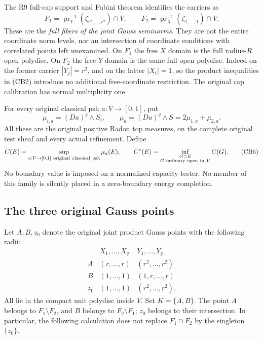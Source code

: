 The R9 full-cap support and Fubini theorem identifies the carriers as
\[
 F_1=\operatorname{pr}_Y^{-1}(\zeta_{r^2,\ldots,r^2})\cap V,
 \qquad
 F_2=\operatorname{pr}_X^{-1}(\zeta_{1,\ldots,1})\cap V.
 \tag{CB4}
\]
These are the \emph{full fibers of the joint Gauss seminorms}.
They are not the entire coordinate norm levels, nor an intersection
of coordinate conditions with correlated points left unexamined.
On $F_1$ the free $X$ domain is the full radius-$R$ open
polydisc. On $F_2$ the free $Y$ domain is the same full open
polydisc. Indeed on the former carrier $|Y_j|=r^2$, and on the
latter $|X_i|=1$, so the product inequalities in (CB2) introduce
no additional free-coordinate restriction. The original cap
calibration has normal multiplicity one.

For every original classical psh $a:V\to[0,1]$, put
\[
 \mu_{i,a}=(Da)^q\wedge S_i,\qquad
 \mu_a=(Da)^q\wedge S=2\mu_{1,a}+\mu_{2,a}.
 \tag{CB5}
\]
All these are the original positive Radon top measures, on the
complete original test sheaf and every actual refinement. Define
\[
 C(E)=\sup_{a:V\to[0,1]\ {\rm original\ classical\ psh}}\mu_a(E),
 \qquad
 C^*(E)=\inf_{\substack{G\supset E\\G\ {\rm ordinary\ open\ in}\ V}}C(G).
 \tag{CB6}
\]
No boundary value is imposed on a normalized capacity tester.
No member of this family is silently placed in a zero-boundary
energy completion.

\subsection{The three original Gauss points}

Let $A,B,z_0$ denote the original joint product Gauss points with
the following radii:
\[
 \begin{array}{c|c|c}
       &X_1,\ldots,X_q&Y_1,\ldots,Y_q\\ \hline
 A     &(r,\ldots,r)&(r^2,\ldots,r^2)\\
 B     &(1,\ldots,1)&(1,r,\ldots,r)\\
 z_0   &(1,\ldots,1)&(r^2,\ldots,r^2).
 \end{array}
 \tag{CB7}
\]
All lie in the compact unit polydisc inside $V$. Set
$K=\{A,B\}$. The point $A$ belongs to $F_1\setminus F_2$,
and $B$ belongs to $F_2\setminus F_1$; $z_0$ belongs to their
intersection. In particular, the following calculation does not
replace $F_1\cap F_2$ by the singleton $\{z_0\}$.

